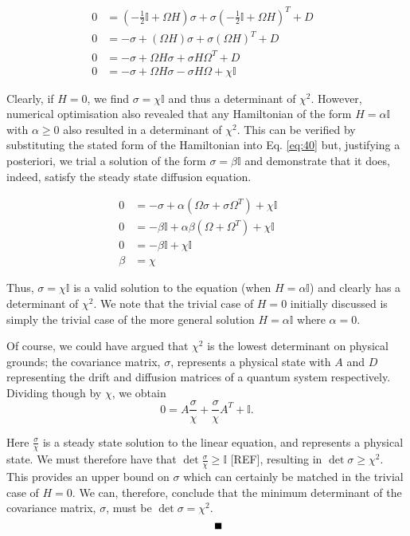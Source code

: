 \documentclass[11pt,a4paper]{article}
\numberwithin{equation}{section}
\begin{document}
	\begin{align}	
	0 &= (-\frac{1}{2}\mathbb{I} + \Omega H)\sigma +\sigma (-\frac{1}{2}\mathbb{I} + \Omega H)^{T} + D&\nonumber\\
	0 &= -\sigma + (\Omega H)\sigma +\sigma (\Omega H)^{T} + D& \nonumber\\
	0 &= -\sigma + \Omega H\sigma +\sigma H\Omega^{T} + D \nonumber&\\
	0 &= -\sigma + \Omega H\sigma -\sigma H\Omega + \chi \mathbb{I} &
	\end{align}
	
	Clearly, if $H=0$, we find $\sigma = \chi \mathbb{I}$ and thus a determinant of $\chi^2$. However, numerical optimisation also revealed that any Hamiltonian of the form $H=\alpha\mathbb{I}$ with $\alpha \geq0$ also resulted in a determinant of  $\chi^2$. This can be verified by substituting the stated form of the Hamiltonian into Eq. \ref{eq:40} but, justifying a posteriori, we trial a solution of the form $\sigma=\beta\mathbb{I}$ and demonstrate that it does, indeed, satisfy the steady state diffusion equation. 
	
	\begin{align*}
	0 &= -\sigma + \alpha (\Omega \sigma + \sigma \Omega^{T}) + \chi \mathbb{I}&\\
	0 &= -\beta \mathbb{I} + \alpha \beta (\Omega + \Omega^T) + \chi \mathbb{I}&\\
	0 & = -\beta \mathbb{I} + \chi \mathbb{I} & \tag*{as $\Omega$ is anti-symmetric}&\\
	\beta &= \chi&
	\end{align*}
	
	Thus, $\sigma=\chi\mathbb{I}$ is a valid solution to the equation (when $H=\alpha\mathbb{I}$) and clearly has a determinant of $\chi^2$. We note that the trivial case of $H=0$ initially discussed is simply the trivial case of the more general solution $H=\alpha\mathbb{I}$ where $\alpha=0$.
	
	Of course, we could have argued that $\chi^2$ is the lowest determinant on physical grounds; the covariance matrix, $\sigma$, represents a physical state with $A$ and $D$ representing the drift and diffusion matrices of a quantum system respectively. Dividing though by $\chi$, we obtain
	\begin{equation*}
	0 = A \frac{\sigma}{\chi} + \frac{\sigma}{\chi} A^T + \mathbb{I}.
	\end{equation*}
	
	Here $\frac{\sigma}{\chi}$ is a steady state solution to the linear equation, and represents a physical state. We must therefore have that $\det\frac{\sigma}{\chi} \geq \mathbb{I}$ [REF], resulting in $\det \sigma \geq \chi^2$. This provides an upper bound on $\sigma$ which can certainly be matched in the trivial case of $H=0$. We can, therefore, conclude that the minimum determinant of the covariance matrix, $\sigma$, must be $\det \sigma = \chi^2$.
	\begin{equation*}
	\tag*{\rule{2mm}{2mm}}
	\end{equation*}
	
\end{document}
